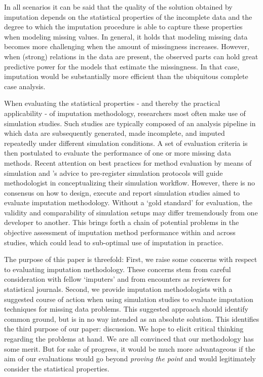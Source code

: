 \documentclass[bimj,fleqn]{w-art}
\begin{document}
In all scenarios it can be said that the quality of the solution obtained by imputation depends on the statistical properties of the incomplete data and the degree to which the imputation procedure is able to capture these properties when modeling missing values. In general, it holds that modeling missing data becomes more challenging when the amount of missingness increases. However, when (strong) relations in the data are present, the observed parts can hold great predictive power for the models that estimate the missingness. In that case, imputation would be substantially more efficient than the ubiquitous complete case analysis.

When evaluating the statistical properties - and thereby the practical applicability - of imputation methodology, researchers most often make use of simulation studies. Such studies are typically composed of an analysis pipeline in which data are subsequently generated, made incomplete, and imputed repeatedly under different simulation conditions. A set of evaluation criteria is then postulated to evaluate the performance of one or more missing data methods. Recent attention on best practices for method evaluation by means of simulation \citep{morr18} and \citet{pawe22}'s advice to pre-register simulation protocols will guide methodologist in conceptualizing their simulation workflow. However, there is no consensus on how to design, execute and report simulation studies aimed to evaluate imputation methodology. Without a `gold standard' for evaluation, the validity and comparability of simulation setups may differ tremendously from one developer to another. This brings forth a chain of potential problems in the objective assessment of imputation method performance within and across studies, which could lead to sub-optimal use of imputation in practice.


The purpose of this paper is threefold: First, we raise some concerns with respect to evaluating imputation methodology. These concerns stem from careful consideration with fellow `imputers' and from encounters as reviewers for statistical journals. Second, we provide imputation methodologists with a suggested course of action when using simulation studies to evaluate imputation techniques for missing data problems. This suggested approach should identify common ground, but is in no way intended as an absolute solution. This identifies the third purpose of our paper: discussion. We hope to elicit critical thinking regarding the problems at hand. We are all convinced that our methodology has some merit. But for sake of progress, it would be much more advantageous if the aim of our evaluations would go beyond \textit{proving the point} and would legitimately consider the statistical properties. 
\end{document}
